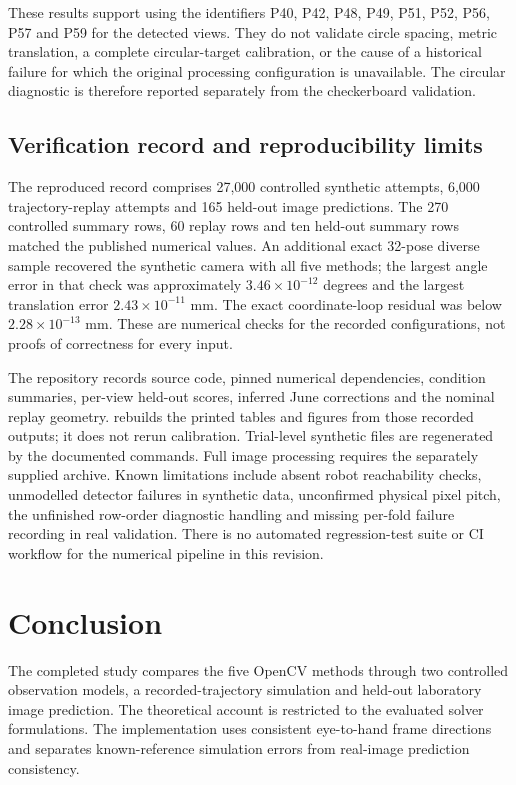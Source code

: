 \documentclass[12pt,a4paper]{article}
\newcommand{\code}[1]{\texttt{\detokenize{#1}}}
\begin{document}
These results support using the identifiers P40, P42, P48, P49, P51, P52, P56, P57 and P59 for the detected views. They do not validate circle spacing, metric translation, a complete circular-target calibration, or the cause of a historical failure for which the original processing configuration is unavailable. The circular diagnostic is therefore reported separately from the checkerboard validation. \cite{experimentcode}

\subsection{Verification record and reproducibility limits}
The reproduced record comprises 27,000 controlled synthetic attempts, 6,000 trajectory-replay attempts and 165 held-out image predictions. The 270 controlled summary rows, 60 replay rows and ten held-out summary rows matched the published numerical values. An additional exact 32-pose diverse sample recovered the synthetic camera with all five methods; the largest angle error in that check was approximately $3.46\times10^{-12}$ degrees and the largest translation error $2.43\times10^{-11}$ mm. The exact coordinate-loop residual was below $2.28\times10^{-13}$ mm. These are numerical checks for the recorded configurations, not proofs of correctness for every input. \cite{experimentcode}

The repository records source code, pinned numerical dependencies, condition summaries, per-view held-out scores, inferred June corrections and the nominal replay geometry. \code{scripts/build_paper_results.py} rebuilds the printed tables and figures from those recorded outputs; it does not rerun calibration. Trial-level synthetic files are regenerated by the documented commands. Full image processing requires the separately supplied archive. Known limitations include absent robot reachability checks, unmodelled detector failures in synthetic data, unconfirmed physical pixel pitch, the unfinished row-order diagnostic handling and missing per-fold failure recording in real validation. There is no automated regression-test suite or CI workflow for the numerical pipeline in this revision. \cite{experimentcode}

\clearpage
\section{Conclusion}\label{sec:conclusion}
The completed study compares the five OpenCV methods through two controlled observation models, a recorded-trajectory simulation and held-out laboratory image prediction. The theoretical account is restricted to the evaluated solver formulations. The implementation uses consistent eye-to-hand frame directions and separates known-reference simulation errors from real-image prediction consistency. \cite{experimentcode,opencv}
\end{document}
